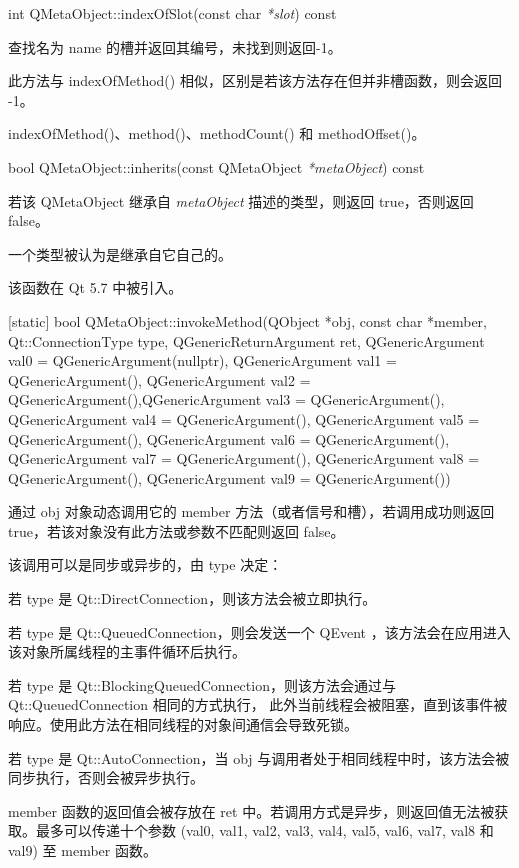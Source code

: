 int QMetaObject::indexOfSlot(const char \emph{*slot}) const

查找名为 name 的槽并返回其编号，未找到则返回-1。

此方法与 indexOfMethod() 相似，区别是若该方法存在但并非槽函数，则会返回 -1。

\begin{seeAlso}
indexOfMethod()、method()、methodCount() 和 methodOffset()。
\end{seeAlso}

bool QMetaObject::inherits(const QMetaObject \emph{*metaObject}) const

若该 QMetaObject 继承自 \emph{metaObject} 描述的类型，则返回 true，否则返回 false。

一个类型被认为是继承自它自己的。

该函数在 Qt 5.7 中被引入。

[static] bool QMetaObject::invokeMethod(QObject *obj, const char *member, 
 Qt::ConnectionType type, QGenericReturnArgument ret, 
 QGenericArgument val0 = QGenericArgument(nullptr), QGenericArgument val1 = QGenericArgument(), 
 QGenericArgument val2 = QGenericArgument(),QGenericArgument val3 = QGenericArgument(), 
 QGenericArgument val4 = QGenericArgument(), QGenericArgument val5 = QGenericArgument(), 
 QGenericArgument val6 = QGenericArgument(), QGenericArgument val7 = QGenericArgument(), 
 QGenericArgument val8 = QGenericArgument(), QGenericArgument val9 = QGenericArgument())

通过 obj 对象动态调用它的 member 方法（或者信号和槽），若调用成功则返回 true，若该对象没有此方法或参数不匹配则返回 false。

该调用可以是同步或异步的，由 type 决定：

\begin{compactitem}
\item 若 type 是 Qt::DirectConnection，则该方法会被立即执行。
\item 若 type 是 Qt::QueuedConnection，则会发送一个 QEvent ，该方法会在应用进入该对象所属线程的主事件循环后执行。
\item 若 type 是 Qt::BlockingQueuedConnection，则该方法会通过与 Qt::QueuedConnection 相同的方式执行，
	此外当前线程会被阻塞，直到该事件被响应。使用此方法在相同线程的对象间通信会导致死锁。
\item 若 type 是 Qt::AutoConnection，当 obj 与调用者处于相同线程中时，该方法会被同步执行，否则会被异步执行。
\end{compactitem}

member 函数的返回值会被存放在 ret 中。若调用方式是异步，则返回值无法被获取。最多可以传递十个参数 (val0, val1, val2, val3, val4, val5, val6, val7, val8 和 val9) 至 member 函数。

